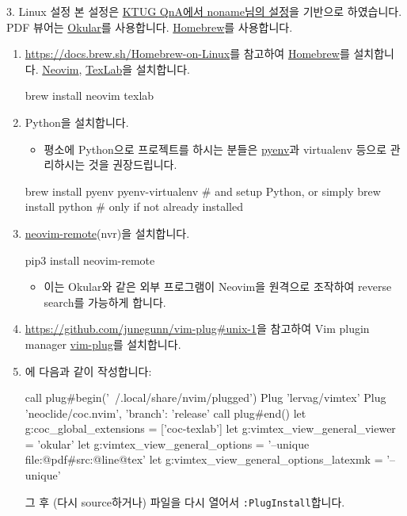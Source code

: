 \documentclass{beamer}
\begin{document}
\begin{frame}{3. Linux 설정}
  본 설정은
  \href{http://www.ktug.org/xe/index.php?document_srl=241426&mid=KTUG_QnA_board}{KTUG QnA에서 noname님의 설정}을 기반으로 하였습니다.
  PDF 뷰어는
  \href{http://www.ktug.org/xe/index.php?document_srl=241426&mid=KTUG_QnA_board}{Okular}를
  사용합니다.
  \href{https://brew.sh/}{Homebrew}를 사용합니다.
  \begin{enumerate}
    \item \url{https://docs.brew.sh/Homebrew-on-Linux}를 참고하여 \href{https://brew.sh/}{Homebrew}를 설치합니다.
      \href{https://neovim.io/}{Neovim},
      \href{https://texlab.netlify.com/}{TexLab}을 설치합니다.
      \begin{shellcode}
        brew install neovim texlab
      \end{shellcode}

    \item Python을 설치합니다.
      \begin{itemize}
        \item 평소에 Python으로 프로젝트를 하시는 분들은
          \href{https://github.com/pyenv/pyenv#homebrew-on-macos}{pyenv}과
          virtualenv 등으로 관리하시는 것을 권장드립니다.
      \end{itemize}
      \begin{shellcode}
        brew install pyenv pyenv-virtualenv  # and setup Python, or simply
        brew install python  # only if not already installed
      \end{shellcode}

    \item \href{https://github.com/mhinz/neovim-remote}{neovim-remote}(nvr)을 설치합니다.
      \begin{shellcode}
        pip3 install neovim-remote
      \end{shellcode}
      \begin{itemize}
        \item 이는 Okular와 같은 외부 프로그램이 Neovim을 원격으로 조작하여
          reverse search를 가능하게 합니다.
      \end{itemize}

    \item \url{https://github.com/junegunn/vim-plug#unix-1}을 참고하여 Vim
      plugin manager \href{https://github.com/junegunn/vim-plug}{vim-plug}를
      설치합니다.
    \item {}에 다음과 같이 작성합니다:
      \begin{vimcode}
        call plug#begin('~/.local/share/nvim/plugged')
        Plug 'lervag/vimtex'
        Plug 'neoclide/coc.nvim', {'branch': 'release'}
        call plug#end()
        let g:coc_global_extensions = ['coc-texlab']
        let g:vimtex_view_general_viewer = 'okular'
        let g:vimtex_view_general_options = '--unique file:@pdf\#src:@line@tex'
        let g:vimtex_view_general_options_latexmk = '--unique'
      \end{vimcode}
      그 후 (다시 source하거나) 파일을 다시 열어서 \verb/:PlugInstall/합니다.


\end{enumerate}
\end{frame}
\end{document}
